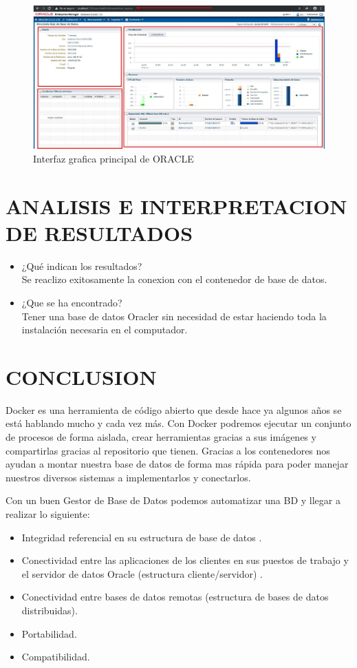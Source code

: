 \documentclass[preprint,12pt]{elsarticle}
\begin{document}
\begin{figure}[H]
	\begin{center}
		\includegraphics[width=13cm]{./IMAGENES/foto15} 
		\caption{Interfaz grafica principal de ORACLE}
	\end{center}
\end{figure}


\section{ANALISIS E INTERPRETACION DE RESULTADOS }
\begin{itemize}
	\item ¿Qué indican los resultados? \\
	Se reaclizo exitosamente la conexion con el contenedor de base de datos.
	\item ¿Que se ha encontrado?\\
	Tener una base de datos Oracler sin necesidad de estar haciendo toda la instalación necesaria en el computador.
\end{itemize}


\section{CONCLUSION}
Docker es una herramienta de código abierto que desde hace ya algunos años se está hablando mucho y cada vez más. Con Docker podremos ejecutar un conjunto de procesos de forma aislada, crear herramientas gracias a sus imágenes y compartirlas gracias al repositorio que tienen. Gracias a los contenedores nos ayudan a montar nuestra base de datos de forma mas rápida para poder manejar nuestros diversos sistemas a implementarlos y conectarlos.

Con un buen Gestor de Base de Datos podemos automatizar una BD y llegar a realizar lo siguiente:


\begin{itemize}
\item Integridad referencial en su estructura de base de datos .
\item Conectividad entre las aplicaciones de los clientes en sus puestos de trabajo y el servidor de datos Oracle (estructura cliente/servidor) .
\item Conectividad entre bases de datos remotas (estructura de bases de datos distribuidas).
\item Portabilidad.
\item Compatibilidad.
\end{itemize}
\end{document}
